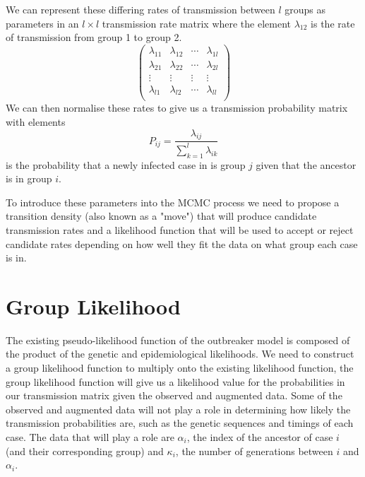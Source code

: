\documentclass[11pt,a4paper]{report}
\begin{document}
We can represent these differing rates of transmission between $l$ groups as parameters in an $l \times l$ transmission rate matrix where the element $\lambda_{12}$ is the rate of transmission from group 1 to group 2.
\[ \left( \begin{array}{cccc}
\lambda_{11} & \lambda_{12} & \cdots & \lambda_{1l} \\
\lambda_{21} & \lambda_{22} & \cdots & \lambda_{2l} \\
\vdots & \vdots & \vdots & \vdots \\
\lambda_{l1} & \lambda_{l2} & \cdots & \lambda_{ll} \\
\end{array} \right) \] 
We can then normalise these rates to give us a transmission probability matrix with elements \[P_{ij} = \frac{\lambda_{ij}}{\sum^{l}_{k=1}\lambda_{ik}} \]
is the probability that a newly infected case in is group $j$ given that the ancestor is in group $i$.

To introduce these parameters into the MCMC process we need to propose a transition density (also known as a "move") that will produce candidate transmission rates and a likelihood function that will be used to accept or reject candidate rates depending on how well they fit the data on what group each case is in.

\section{Group Likelihood}
The existing pseudo-likelihood function of the outbreaker model is composed of the product of the genetic and epidemiological likelihoods. We need to construct a group likelihood function to multiply onto the existing likelihood function, the group likelihood function will give us a likelihood value for the probabilities in our transmission matrix given the observed and augmented data. Some of the observed and augmented data will not play a role in determining how likely the transmission probabilities are, such as the genetic sequences and timings of each case. The data that will play a role are $\alpha_i$, the index of the ancestor of case $i$ (and their corresponding group) and $\kappa_i$, the number of generations between $i$ and $\alpha_i$.\\
\end{document}

